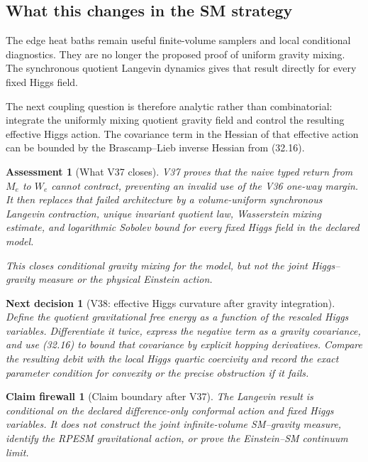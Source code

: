 \documentclass[11pt]{article}
\newtheorem{firewall}[theorem]{Claim firewall}
\newtheorem{decision}[theorem]{Next decision}
\newtheorem{assessment}[theorem]{Assessment}
\theoremstyle{remark}
\begin{document}
\subsection{What this changes in the SM strategy}

The edge heat baths remain useful finite-volume samplers and local
conditional diagnostics.  They are no longer the proposed proof of
uniform gravity mixing.  The synchronous quotient Langevin dynamics
gives that result directly for every fixed Higgs field.

The next coupling question is therefore analytic rather than
combinatorial: integrate the uniformly mixing quotient gravity field
and control the resulting effective Higgs action.  The covariance term
in the Hessian of that effective action can be bounded by the
Brascamp--Lieb inverse Hessian from (32.16).

\begin{assessment}[What V37 closes]
\label{ass:v17v37-status}
V37 proves that the naive typed return from \(M_e\) to \(W_e\) cannot
contract, preventing an invalid use of the V36 one-way margin.  It then
replaces that failed architecture by a volume-uniform synchronous
Langevin contraction, unique invariant quotient law, Wasserstein
mixing estimate, and logarithmic Sobolev bound for every fixed Higgs
field in the declared model.

This closes conditional gravity mixing for the model, but not the joint
Higgs--gravity measure or the physical Einstein action.
\end{assessment}

\begin{decision}[V38: effective Higgs curvature after gravity integration]
\label{dec:v17v37-next}
Define the quotient gravitational free energy as a function of the
rescaled Higgs variables.  Differentiate it twice, express the negative
term as a gravity covariance, and use (32.16) to bound that covariance
by explicit hopping derivatives.  Compare the resulting debit with the
local Higgs quartic coercivity and record the exact parameter condition
for convexity or the precise obstruction if it fails.
\end{decision}

\begin{firewall}[Claim boundary after V37]
\label{fire:v17v37}
The Langevin result is conditional on the declared difference-only
conformal action and fixed Higgs variables.  It does not construct the
joint infinite-volume SM--gravity measure, identify the RPESM
gravitational action, or prove the Einstein--SM continuum limit.
\end{firewall}
\end{document}
